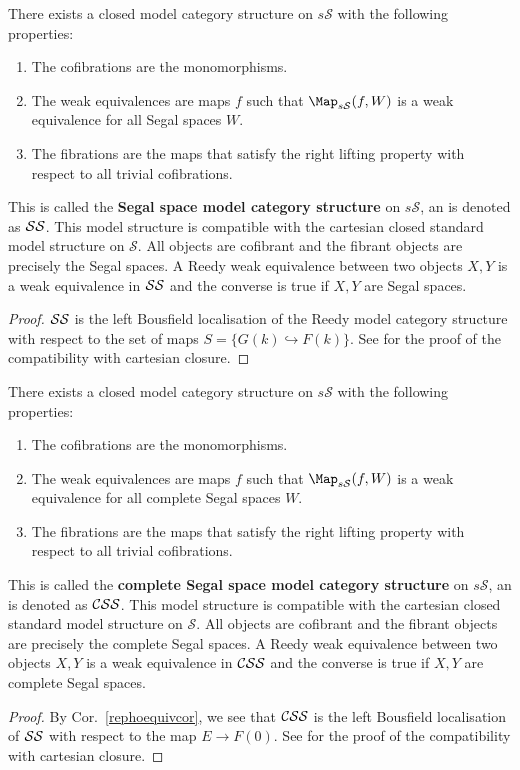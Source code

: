 \begin{thm}
There exists a closed model category structure on $s\mathcal S$ with the following properties:
\begin{enumerate}
\item The cofibrations are the monomorphisms.
\item The weak equivalences are maps $f$ such that $\Map_{s\mathcal S}(f,W)$ is a weak equivalence for all Segal spaces $W$.
\item The fibrations are the maps that satisfy the right lifting property with respect to all trivial cofibrations.
\end{enumerate}
This is called the {\bf Segal space model category structure} on $s\mathcal S$, an is denoted as ${\cal SS}$. This model structure is compatible with the cartesian closed standard model structure on $\mathcal S$. All objects are cofibrant and the fibrant objects are precisely the Segal spaces. A Reedy weak equivalence between two objects $X,Y$ is a weak equivalence in ${\cal SS}$ and the converse is true if $X,Y$ are Segal spaces.
\end{thm}
\begin{proof}
${\cal SS}$ is the left Bousfield localisation of the Reedy model category structure with respect to the set of maps $S=\{G(k)\hookrightarrow F(k)\}$. See \cite[Thm 7.1]{rezk} for the proof of the compatibility with cartesian closure.
\end{proof}

\begin{thm}
There exists a closed model category structure on $s\mathcal S$ with the following properties:
\begin{enumerate}
\item The cofibrations are the monomorphisms.
\item The weak equivalences are maps $f$ such that $\Map_{s\mathcal S}(f,W)$ is a weak equivalence for all complete Segal spaces $W$.
\item The fibrations are the maps that satisfy the right lifting property with respect to all trivial cofibrations.
\end{enumerate}
This is called the {\bf complete Segal space model category structure} on $s\mathcal S$, an is denoted as ${\cal CSS}$. This model structure is compatible with the cartesian closed standard model structure on $\mathcal S$. All objects are cofibrant and the fibrant objects are precisely the complete Segal spaces. A Reedy weak equivalence between two objects $X,Y$ is a weak equivalence in ${\cal CSS}$ and the converse is true if $X,Y$ are complete Segal spaces.
\end{thm}
\begin{proof}
By Cor.~\ref{rephoequivcor}, we see that ${\cal CSS}$ is the left Bousfield localisation of ${\cal SS}$ with respect to the map $E\to F(0)$. See \cite[Thm 7.2]{rezk}for the proof of the compatibility with cartesian closure.
\end{proof}

